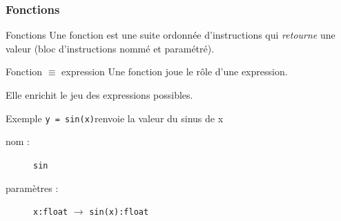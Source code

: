 \begin{frame}
\frametitle{Fonctions}
\begin{block}{Fonctions}
Une fonction est une suite ordonnée d'instructions
qui {\em retourne} une valeur
(bloc d'instructions nommé et paramétré).
\end{block}
\begin{block}{Fonction $\equiv$ expression}
Une fonction joue le rôle d'une expression.

Elle enrichit le jeu des expressions possibles.
\end{block}
\begin{block}{Exemple}
{\tt y = sin(x)}\hfill renvoie la valeur du sinus de x
\begin{description}
\item[nom :] {\tt sin}
\item[paramètres :] {\tt x:float} $\rightarrow$ {\tt sin(x):float} 
\end{description}
\end{block}

\end{frame}
